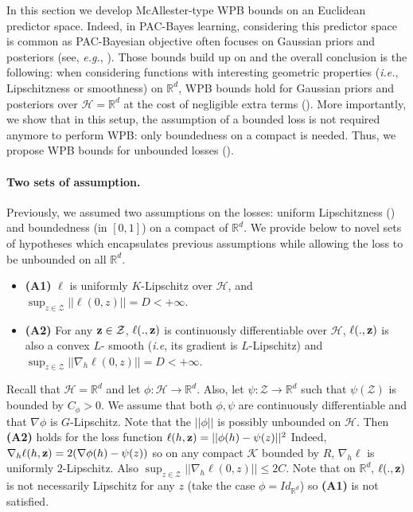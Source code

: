 In this section we develop McAllester-type WPB bounds on an Euclidean predictor space. Indeed, in PAC-Bayes learning, considering this predictor space is common as PAC-Bayesian objective often focuses on Gaussian priors and posteriors (see, \emph{e.g.}, \citealp{dziugaite2017computing,amit2018meta}).
Those bounds build up on  and the overall conclusion is the following: when considering functions with interesting geometric properties (\emph{i.e.}, Lipschitzness or smoothness) on $\mathbb{R}^d$, WPB bounds hold for Gaussian priors and posteriors over $\mathcal{H}= \mathbb{R}^d$ at the cost of negligible extra terms ().
More importantly, we show that in this setup, the assumption of a bounded loss is not required anymore to perform WPB: only boundedness on a compact is needed. Thus, we propose WPB bounds for unbounded losses ().

\paragraph{Two sets of assumption.} Previously, we assumed two assumptions on the losses: uniform Lipschitzness () and boundedness (in $[0,1]$) on a compact of $\mathbb{R}^d$. We provide below to novel sets of hypotheses which encapsulates previous assumptions while allowing the loss to be unbounded on all $\mathbb{R}^d$.
\begin{itemize}
  \item \textbf{(A1)} $\ell$ is uniformly $K$-Lipschitz over  $\mathcal{H}$, and $\sup_{z\in\mathcal{Z}} || \ell(0,z)|| =D< +\infty.$
  \item \textbf{(A2)} For any $\mathbf{z}\in\mathcal{Z}$, $\ell(.,\mathbf{z})$ is continuously differentiable over $\mathcal{H}$, $\ell(.,\mathbf{z})$ is also a convex $L$- smooth (\emph{i.e}, its gradient is $L$-Lipschitz) and $\sup_{z\in\mathcal{Z}} ||\nabla_h \ell(0,z)|| =D< +\infty$.
\end{itemize}
\begin{example}
Recall that $\mathcal{H}=\mathbb{R}^d$ and let $\phi:\mathcal{H}\rightarrow \mathbb{R}^d$.
Also, let $\psi :\mathcal{Z}\rightarrow \mathbb{R}^d$ such that $\psi(\mathcal{Z})$ is bounded by $C_\phi >0$. We assume that both $\phi,\psi$ are continuously differentiable and that $\nabla\phi$ is $G$-Lipschitz.
Note that the $||\phi||$ is possibly unbounded on $\mathcal{H}$.
Then \textbf{(A2)} holds for the loss function $\ell(h,\mathbf{z})= ||\phi(h)-\psi(z)||^2$
Indeed, $\nabla_h \ell(h,\mathbf{z})= 2(\nabla\phi (h) -\psi(z))$ so on any compact $\mathcal{K}$ bounded by $R$, $\nabla_h \ell$ is uniformly $2$-Lipschitz. Also $\sup_{z\in\mathcal{Z}} ||\nabla_h \ell(0,z)|| \leq 2C$.
Note that on $\mathbb{R}^d$, $\ell(.,\mathbf{z})$ is not necessarily Lipschitz for any $z$ (take the case $\phi= Id_{\mathbb{R}^d}$) so \textbf{(A1)} is not satisfied.
\end{example}


